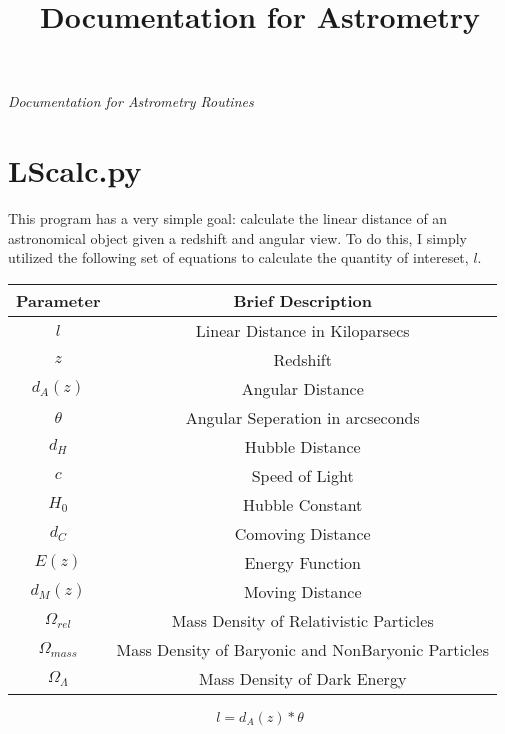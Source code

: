 \documentclass[11pt,letterpaper]{article}
\begin{document}
	\univlogo
	
	\title{Documentation for Astrometry}
	
	\textit{Documentation for Astrometry Routines}
	
	\tableofcontents
	
	\newpage
	
	
	\newpage
\section{LScalc.py}
This program has a very simple goal: calculate the linear distance of an astronomical object given a redshift and angular view. To do this, I simply utilized the following set of equations to calculate the quantity of intereset, $l$.
\begin{center}
	\begin{tabular}{|c|c|}
		\hline 
		Parameter & Brief Description \\ 
		\hline 
		$l$ & Linear Distance in Kiloparsecs \\ 
		\hline 
		$z$ & Redshift \\
		\hline
		$d_A(z)$ & Angular Distance \\
		\hline 
		$\theta$ & Angular Seperation in arcseconds \\
		\hline
		$d_H$ & Hubble Distance \\
		\hline
		$c$ & Speed of Light \\
		\hline
		$H_0$ & Hubble Constant \\
		\hline
		$d_C$ & Comoving Distance \\
		\hline 
		$E(z)$ & Energy Function \\
		\hline 
		$d_M(z)$ & Moving Distance \\
		\hline 
		$\Omega_{rel}$ & Mass Density of Relativistic Particles \\
		\hline
		$\Omega_{mass}$ & Mass Density of Baryonic and NonBaryonic Particles \\
		\hline
		$\Omega_{\Lambda}$ & Mass Density of Dark Energy \\
		\hline
	\end{tabular} 
\end{center}



\begin{equation}
l = d_A(z)*\theta
\end{equation}
\end{document}
